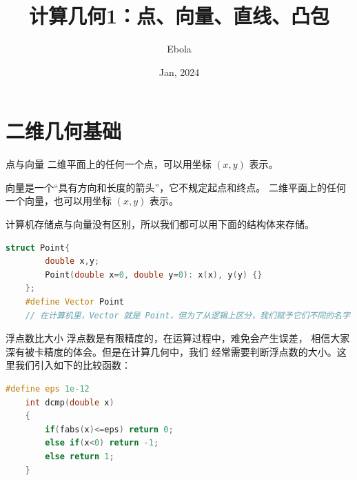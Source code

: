 \documentclass{beamer}
\author{Ebola}
\title{计算几何1：点、向量、直线、凸包}
\institute{
    Institute of Mathematics, \\
    Zhejiang University.
}
\date{Jan, 2024}
\begin{document}
\begin{frame}
    \titlepage
\end{frame}

\begin{frame}
    \tableofcontents[sectionstyle=show,subsectionstyle=show/shaded/hide,subsubsectionstyle=show/shaded/hide]
\end{frame}

\section{二维几何基础}

\begin{frame}[fragile]{点与向量}
    二维平面上的任何一个点，可以用坐标 $(x,y)$ 表示。
    \vspace{1em}

    \pause
    向量是一个“具有方向和长度的箭头”，它不规定起点和终点。
    二维平面上的任何一个向量，也可以用坐标 $(x,y)$ 表示。
    \vspace{1em}

    \pause
    计算机存储点与向量没有区别，所以我们都可以用下面的结构体来存储。
\begin{lstlisting}[language=c++]
    struct Point{
        double x,y;
        Point(double x=0, double y=0): x(x), y(y) {}
    };
    #define Vector Point
    // 在计算机里，Vector 就是 Point，但为了从逻辑上区分，我们赋予它们不同的名字
\end{lstlisting}
\end{frame}


\begin{frame}[fragile]{浮点数比大小}
    \small
    浮点数是有限精度的，在运算过程中，难免会产生误差，
    相信大家深有被卡精度的体会。但是在计算几何中，我们
    经常需要判断浮点数的大小。\pause 这里我们引入如下的比较函数：
\begin{lstlisting}[language=c++]
    #define eps 1e-12
    int dcmp(double x)
    {
        if(fabs(x)<=eps) return 0;
        else if(x<0) return -1;
        else return 1;
    }
\end{lstlisting}
\end{frame}
\end{document}
